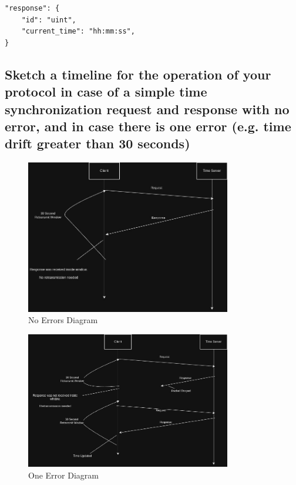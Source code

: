 \documentclass{article}
\begin{document}
		\begin{verbatim}
"response": {
	"id": "uint",
	"current_time": "hh:mm:ss",
}
		\end{verbatim}

\subsection{Sketch a timeline for the operation of your protocol in case of a simple time
synchronization request and response with no error, and in case there is one error (e.g.
time drift greater than 30 seconds)}

	\begin{figure}[H]
		\centering
		\includegraphics[width=0.8\textwidth]{no_errors.jpg}
		\caption{No Errors Diagram}
		\label{fig:no_errors}
	\end{figure}

	\begin{figure}[H]
		\centering
		\includegraphics[width=0.8\textwidth]{one_error.jpg}
		\caption{One Error Diagram}
		\label{fig:one_error}
	\end{figure}
\end{document}
